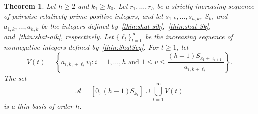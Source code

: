 \documentclass{amsart}
\newtheorem{theorem}{Theorem}
\begin{document}
\begin{theorem}       \label{thin:theorem:basis}
Let $h \geq 2$ and $k_1 \geq k_0$.  
Let $r_1,\ldots, r_h$ be a strictly increasing sequence of pairwise relatively prime positive integers, and let $s_{1,k},\ldots, s_{h,k}$, $S_k$, and $a_{1,k},\ldots, a_{h,k}$ be the integers defined by~\eqref{thin:shat-sik},~\eqref{thin:shat-Sk}, and~\eqref{thin:shat-aik}, respectively.  Let $\{\ell_t\}_{t=0}^{\infty}$ be the increasing sequence of nonnegative integers defined by~\eqref{thin:ShatSeq}.  
For $t \geq 1$, let
\[
V(t) = \left\{a_{i,k_1+\ell_t} v_i  : i = 1,\ldots, h \text{ and }
1 \leq v \leq  \frac{(h-1)S_{k_1+ \ell_{t+1}}}{ a_{i,k+\ell_t} } \right\}.
\]
The set
\[
{\ensuremath{ \mathcal A}} = [0,(h-1)S_{k_1}] \cup \bigcup_{t = 1}^{\infty}   V(t)
\]
is a thin basis of order $h$.
\end{theorem}
\end{document}
